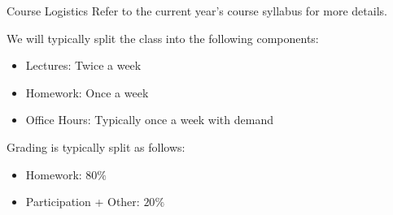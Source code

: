 \documentclass[aspectratio=169]{beamer}
\begin{document}
\begin{frame}{Course Logistics}
    Refer to the current year's course syllabus for more details.

    \vspace{\baselineskip}

    We will typically split the class into the following components:
    \begin{itemize}
        \item Lectures: Twice a week
        \item Homework: Once a week
        \item Office Hours: Typically once a week with demand
    \end{itemize}

    \vspace{\baselineskip}

    Grading is typically split as follows:
    \begin{itemize}
        \item Homework: $80\%$
        \item Participation + Other: $20\%$
    \end{itemize}
\end{frame}
\end{document}
